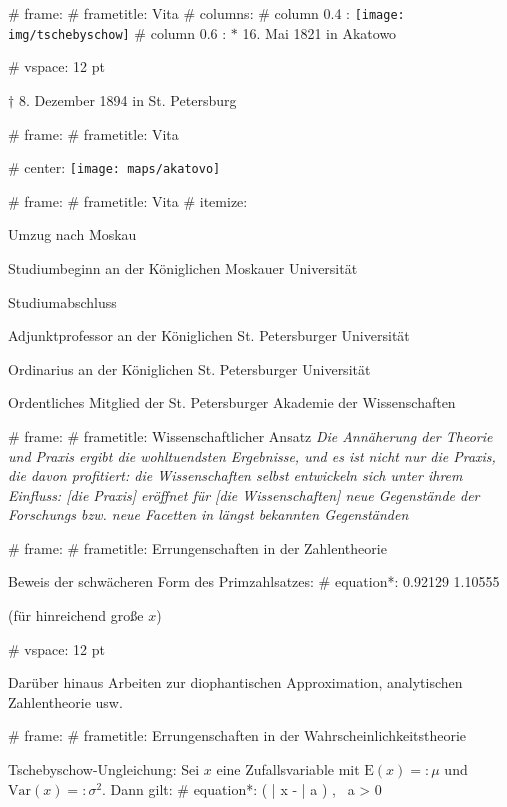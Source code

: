 # frame:
  # frametitle: Vita
  # columns:
    # column {0.4 \textwidth}:
      \texttt{[image: img/tschebyschow]}
    # column {0.6 \textwidth}:
      $*$ 16. Mai 1821 in Akatowo

      # vspace: 12 pt

      $\dagger$ 8. Dezember 1894 in St. Petersburg

# frame:
  # frametitle: Vita

  # center:
    \texttt{[image: maps/akatovo]}

# frame:
  # frametitle: Vita
    # itemize:
      \item[1832 (11)] Umzug nach Moskau
      \item[1837 (16)] Studiumbeginn an der Königlichen Moskauer Universität
      \item[1841 (20)] Studiumabschluss
      \item[1847 (26)] Adjunktprofessor an der Königlichen St. Petersburger Universität
      \item[1850 (29)] Ordinarius an der Königlichen St. Petersburger Universität
      \item[1858 (37)] Ordentliches Mitglied der St. Petersburger Akademie der Wissenschaften

# frame:
  # frametitle: Wissenschaftlicher Ansatz
    \emph{\glqq{}Die Annäherung der Theorie und Praxis ergibt die wohltuendsten Ergebnisse,
    und es ist nicht nur die Praxis, die davon profitiert:
    die Wissenschaften selbst entwickeln sich unter ihrem Einfluss:
    [die Praxis] eröffnet für [die Wissenschaften] neue Gegenstände der Forschungs
    bzw. neue Facetten in längst bekannten Gegenständen\grqq}

# frame:
  # frametitle: Errungenschaften in der Zahlentheorie

  Beweis der schwächeren Form des Primzahlsatzes:
  # equation*:
    \num{0.92129} \leqslant {} \leqslant \num{1.10555}

  (für hinreichend große $x$)

  # vspace: 12 pt

  Darüber hinaus Arbeiten zur diophantischen Approximation,
  analytischen Zahlentheorie usw.

# frame:
  # frametitle: Errungenschaften in der Wahrscheinlichkeitstheorie

  Tschebyschow-Ungleichung: Sei $x$ eine Zufallsvariable mit
  $\text{E}(x) =: \mu$ und $\text{Var}(x) =: \sigma^2$. Dann gilt:
  # equation*:
    \!\left( | x - \mu | \geqslant a \right) \leqslant {},
    \ a > 0

